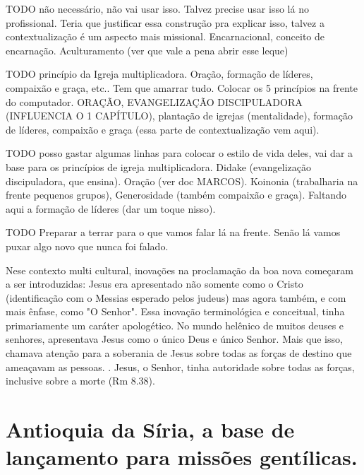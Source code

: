 \documentclass[
	12pt,				%
	openright,			%
	twoside,			%
	a4paper,			%
	english,			%
	french,				%
	spanish,			%
	brazil				%
	]{abntex2}
\begin{document}
TODO não necessário, não vai usar isso. Talvez precise usar isso lá no profissional. Teria que justificar essa construção pra explicar isso, talvez a contextualização é um aspecto mais missional. Encarnacional, conceito de encarnação. Aculturamento (ver que vale a pena abrir esse leque)

TODO princípio da Igreja multiplicadora. Oração, formação de líderes, compaixão e graça, etc.. Tem que amarrar tudo. Colocar os 5 princípios na frente do computador. ORAÇÃO, EVANGELIZAÇÃO DISCIPULADORA (INFLUENCIA O 1 CAPÍTULO), plantação de igrejas (mentalidade), formação de líderes, compaixão e graça (essa parte de contextualização vem aqui). 

TODO posso gastar algumas linhas para colocar o estilo de vida deles, vai dar a base para os princípios de igreja multiplicadora. Didake (evangelização discipuladora, que ensina). Oração (ver doc MARCOS). Koinonia (trabalharia na frente pequenos grupos), Generosidade (também compaixão e graça). Faltando aqui a formação de líderes (dar um toque nisso).

TODO Preparar a terrar para o que vamos falar lá na frente. Senão lá vamos puxar algo novo que nunca foi falado.

Nese contexto multi cultural, inovações na proclamação da boa nova começaram a ser introduzidas: Jesus era apresentado não somente como o Cristo (identificação com o Messias esperado pelos judeus) mas agora também, e com mais ênfase, como "O Senhor". Essa inovação terminológica e conceitual, tinha primariamente um caráter apologético. No mundo helênico de muitos deuses e senhores, apresentava Jesus como o único Deus e único Senhor. Mais que isso, chamava atenção para a soberania de Jesus sobre todas as forças de destino que ameaçavam as pessoas. \cite[170]{green}. Jesus, o Senhor, tinha autoridade sobre todas as forças, inclusive sobre a morte (Rm 8.38).

\section{Antioquia da Síria, a base de lançamento para missões gentílicas.}
\end{document}
